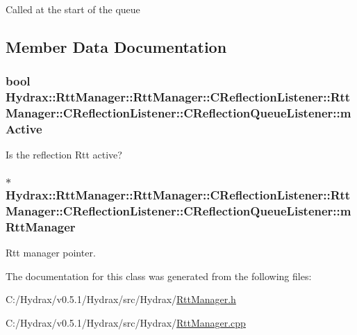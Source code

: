Called at the start of the queue 

\subsection{Member Data Documentation}
\hypertarget{class_hydrax_1_1_rtt_manager_1_1_c_reflection_listener_1_1_c_reflection_queue_listener_d2a1e19d54ceaf9d2c99cf613e4ba23a}{
\subsubsection[{mActive}]{\setlength{\rightskip}{0pt plus 5cm}bool Hydrax::RttManager::RttManager::CReflectionListener::RttManager::CReflectionListener::CReflectionQueueListener::mActive}}
\label{class_hydrax_1_1_rtt_manager_1_1_c_reflection_listener_1_1_c_reflection_queue_listener_d2a1e19d54ceaf9d2c99cf613e4ba23a}


Is the reflection Rtt active? 

\hypertarget{class_hydrax_1_1_rtt_manager_1_1_c_reflection_listener_1_1_c_reflection_queue_listener_1e870e5172aaf8ff82b598345f358830}{
\subsubsection[{mRttManager}]{$\ast$ Hydrax::RttManager::RttManager::CReflectionListener::RttManager::CReflectionListener::CReflectionQueueListener::mRttManager}}
\label{class_hydrax_1_1_rtt_manager_1_1_c_reflection_listener_1_1_c_reflection_queue_listener_1e870e5172aaf8ff82b598345f358830}


Rtt manager pointer. 



The documentation for this class was generated from the following files:\begin{CompactItemize}
\item 
C:/Hydrax/v0.5.1/Hydrax/src/Hydrax/\hyperlink{_rtt_manager_8h}{RttManager.h}\item 
C:/Hydrax/v0.5.1/Hydrax/src/Hydrax/\hyperlink{_rtt_manager_8cpp}{RttManager.cpp}\end{CompactItemize}
